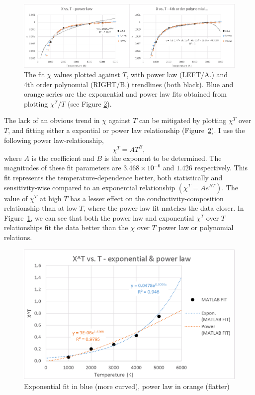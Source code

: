 \begin{figure}[h!]
  \includegraphics[width=\linewidth]{Figures/draft_XT.png}
  \caption{The fit $\chi$ values plotted against $T$, with power law (LEFT/A.) and 4th order polynomial (RIGHT/B.) trendlines (both black). Blue and orange series are the exponential and power law fits obtained from plotting $\chi^T/T$ (see Figure \ref{fig:draft_xtt}).}
  \label{fig:draft_xt}
\end{figure}

The lack of an obvious trend in $\chi$ against $T$ can be mitigated by plotting $\chi^T$ over $T$, and fitting either a expontial or power law relationship (Figure~\ref{fig:draft_xtt}). I use the following power law-relationship, 
%
\begin{equation}%
\chi^{T}=A T^{B},
\label{eq.chi_scale}
\end{equation}%
%
where $A$ is the coefficient and $B$ is the exponent to be determined. The magnitudes of these fit parameters are $3.468 \times 10^{-6}$ and $1.426$ respectively. This fit represents the temperature-dependence better, both statistically and sensitivity-wise compared to an exponential relationship $\left ( \chi^{T}=A e^{BT}\right )$. The value of $\chi^T$ at high $T$ has a lesser effect on the conductivity-composition relationship than at low $T$, where the power law fit matches the data closer. In Figure~\ref{fig:draft_xt}, we can see that both the power law and exponential $\chi^T$ over $T$ relationships fit the data better than the $\chi$ over $T$ power law or polynomial relations.

\begin{figure}[h]
  \includegraphics[width=\linewidth]{Figures/draft_XTT.png}
  \caption{Exponential fit in blue (more curved), power law in orange (flatter)}
  \label{fig:draft_xtt}
\end{figure}

